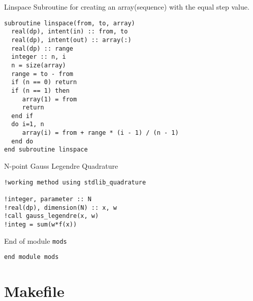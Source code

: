 \documentclass[a4paper,11pt,twoside]{article}
\begin{document}
Linspace Subroutine for creating an array(sequence) with the equal step value.

\begin{verbatim}
subroutine linspace(from, to, array)
  real(dp), intent(in) :: from, to
  real(dp), intent(out) :: array(:)
  real(dp) :: range
  integer :: n, i
  n = size(array)
  range = to - from
  if (n == 0) return
  if (n == 1) then
     array(1) = from
     return
  end if
  do i=1, n
     array(i) = from + range * (i - 1) / (n - 1)
  end do
end subroutine linspace
\end{verbatim}

N-point Gauss Legendre Quadrature


\begin{verbatim}
!working method using stdlib_quadrature

!integer, parameter :: N
!real(dp), dimension(N) :: x, w
!call gauss_legendre(x, w)
!integ = sum(w*f(x))
\end{verbatim}

End of module \texttt{mods}

\begin{verbatim}
end module mods
\end{verbatim}


\clearpage

\section{Makefile}
\label{sec:org801ff69}
\end{document}
